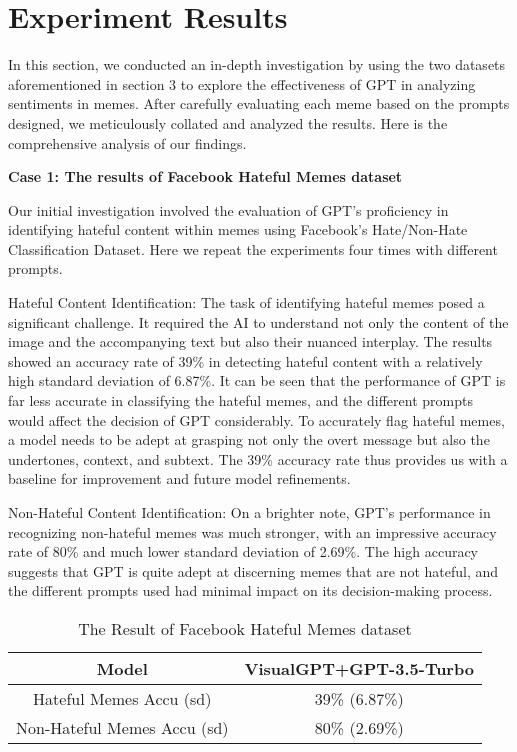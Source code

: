 \documentclass[conference]{IEEEtran}
\begin{document}
\section{Experiment Results}

In this section, we conducted an in-depth investigation by using the two datasets aforementioned in section 3 to explore the effectiveness of GPT in analyzing sentiments in memes. After carefully evaluating each meme based on the prompts designed, we meticulously collated and analyzed the results. Here is the comprehensive analysis of our findings.

{\bfseries Case 1: The results of Facebook Hateful Memes dataset}

Our initial investigation involved the evaluation of GPT's proficiency in identifying hateful content within memes using Facebook's Hate/Non-Hate Classification Dataset. Here we repeat the experiments four times with different prompts.

Hateful Content Identification: The task of identifying hateful memes posed a significant challenge. It required the AI to understand not only the content of the image and the accompanying text but also their nuanced interplay. The results showed an accuracy rate of 39\% in detecting hateful content with a relatively high standard deviation of 6.87\%. It can be seen that the performance of GPT is far less accurate in classifying the hateful memes, and the different prompts would affect the decision of GPT considerably. To accurately flag hateful memes, a model needs to be adept at grasping not only the overt message but also the undertones, context, and subtext. The 39\% accuracy rate thus provides us with a baseline for improvement and future model refinements.


Non-Hateful Content Identification: On a brighter note, GPT's performance in recognizing non-hateful memes was much stronger, with an impressive accuracy rate of 80\% and much lower standard deviation of 2.69\%. The high accuracy suggests that GPT is quite adept at discerning memes that are not hateful, and the different prompts used had minimal impact on its decision-making process.

\begin{table}[htbp]
  \caption{The Result of Facebook Hateful Memes dataset}
  \label{tab:freq}
  \centering
  \begin{tabular}{|c|c|}
    \hline
    Model & \multicolumn{1}{|c|}{VisualGPT+GPT-3.5-Turbo} \\
    \hline
    Hateful Memes Accu (sd) & 39\% (6.87\%) \\
    \hline
    Non-Hateful Memes Accu (sd) & 80\% (2.69\%) \\
    \hline
  \end{tabular}
\end{table}
\end{document}

